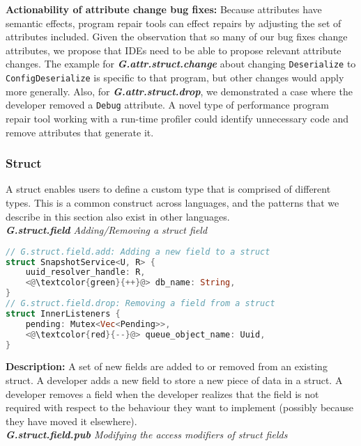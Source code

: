 \noindent\textbf{Actionability of attribute change bug fixes:} Because attributes have semantic effects, program repair tools can effect repairs by adjusting the set of attributes included. Given the observation that so many of our bug fixes change attributes, we propose that IDEs need to be able to propose relevant attribute changes. The example for \textit{\textbf{G.attr.struct.change}} about changing \verb+Deserialize+ to \verb+ConfigDeserialize+ is specific to that program, but other changes would apply more generally. Also, for \textit{\textbf{G.attr.struct.drop}}, we demonstrated a case where the developer removed a \verb+Debug+ attribute. A novel type of performance program repair tool working with a run-time profiler could identify unnecessary code and remove attributes that generate it. 

\subsubsection{Struct} 

A struct enables users to define a custom type that is comprised of different types. This is a common construct across languages, and the patterns that we describe in this section also exist in other languages. \\

\noindent\textit{\textbf{G.struct.field} Adding/Removing a struct field}

\begin{lstlisting}[language=Rust, style=colouredRust]
// G.struct.field.add: Adding a new field to a struct
struct SnapshotService<U, R> {
    uuid_resolver_handle: R,
    <@\textcolor{green}{++}@> db_name: String,
}
// G.struct.field.drop: Removing a field from a struct
struct InnerListeners {
    pending: Mutex<Vec<Pending>>,
    <@\textcolor{red}{--}@> queue_object_name: Uuid,
}

\end{lstlisting}

\noindent\textbf{Description:} A set of new fields are added to or removed from an existing struct. A developer adds a new field to store a new piece of data in a struct. A developer removes a field when the developer realizes that the field is not required with respect to the behaviour they want to implement (possibly because they have moved it elsewhere). \\

\noindent\textit{\textbf{G.struct.field.pub} Modifying the access modifiers of struct fields}


